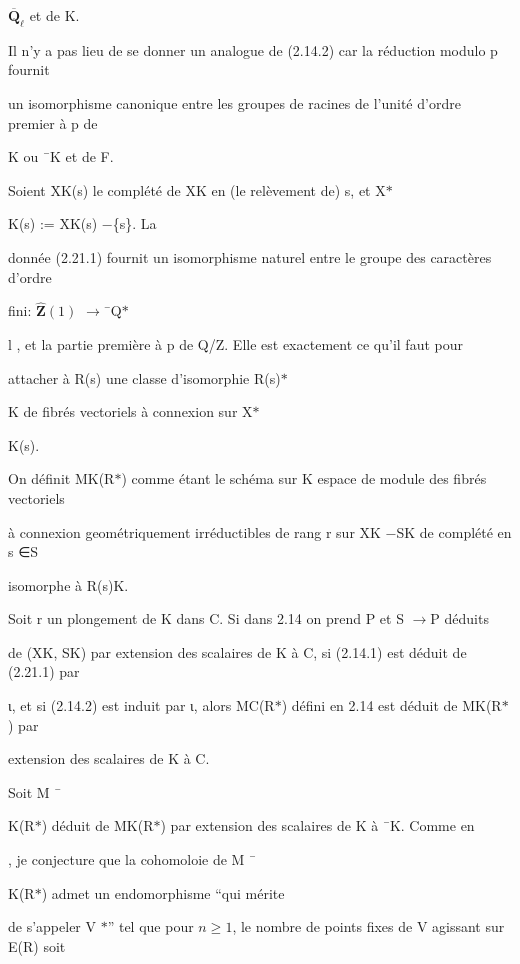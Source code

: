 \documentclass[11pt]{article}
\begin{document}
\noindent \(\overline{\mathbf Q}_{\ell}\) et de K.\par
\noindent Il n’y a pas lieu de se donner un analogue de (2.14.2) car la réduction modulo p fournit\par
\noindent un isomorphisme canonique entre les groupes de racines de l’unité d’ordre premier à p de\par
\noindent K ou ¯K et de F.\par
\noindent Soient XK(s) le complété de XK en (le relèvement de) s, et X\(*\)\par
\noindent K(s) := XK(s) −\{s\}. La\par
\noindent donnée (2.21.1) fournit un isomorphisme naturel entre le groupe des caractères d’ordre\par
\noindent fini: \(\widehat{\mathbf Z}(1)\) \(\to\)¯Q\(*\)\par
\noindent l , et la partie première à p de Q/Z. Elle est exactement ce qu’il faut pour\par
\noindent attacher à R(s) une classe d’isomorphie R(s)\(*\)\par
\noindent K de fibrés vectoriels à connexion sur X\(*\)\par
\noindent K(s).\par
\noindent On définit MK(R\(*\)) comme étant le schéma sur K espace de module des fibrés vectoriels\par
\noindent à connexion geométriquement irréductibles de rang r sur XK −SK de complété en s ∈S\par
\noindent isomorphe à R(s)K.\par
\noindent Soit r un plongement de K dans C. Si dans 2.14 on prend P et S \(\to\)P déduits\par
\noindent de (XK, SK) par extension des scalaires de K à C, si (2.14.1) est déduit de (2.21.1) par\par
\noindent ι, et si (2.14.2) est induit par ι, alors MC(R\(*\)) défini en 2.14 est déduit de MK(R\(*\)) par\par
\noindent extension des scalaires de K à C.\par
\noindent Soit M ¯\par
\noindent K(R\(*\)) déduit de MK(R\(*\)) par extension des scalaires de K à ¯K. Comme en\par
{}, je conjecture que la cohomoloie de M ¯\par
\noindent K(R\(*\)) admet un endomorphisme “qui mérite\par
\noindent de s’appeler V \(*\)” tel que pour \(n\geq 1\), le nombre de points fixes de V agissant sur E(R) soit\par
\end{document}
